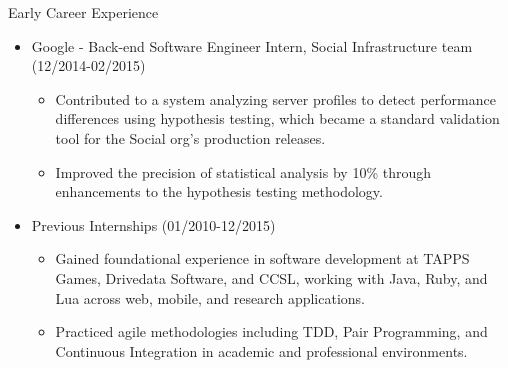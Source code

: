 
\normalsize{Early Career Experience}
\begin{itemize}
    \item \footnotesize{Google - Back-end Software Engineer Intern, Social Infrastructure team (12/2014-02/2015)}
    \begin{itemize}
        \item \scriptsize{Contributed to a system analyzing server profiles to detect performance differences using hypothesis testing, which became a standard validation tool for the Social org's production releases.}
        \item \scriptsize{Improved the precision of statistical analysis by 10\% through enhancements to the hypothesis testing methodology.}
    \end{itemize}

    \item \footnotesize{Previous Internships (01/2010-12/2015)}
    \begin{itemize}
        \item \scriptsize{Gained foundational experience in software development at TAPPS Games, Drivedata Software, and CCSL, working with Java, Ruby, and Lua across web, mobile, and research applications.}
        \item \scriptsize{Practiced agile methodologies including TDD, Pair Programming, and Continuous Integration in academic and professional environments.}
    \end{itemize}
\end{itemize}